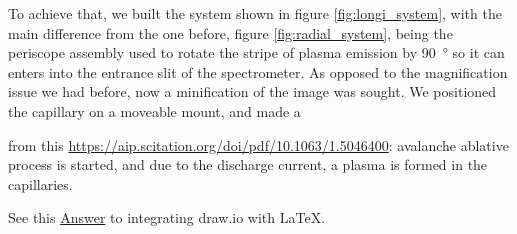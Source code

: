 \documentclass[nofonts]{tufte-book}
\begin{document}
To achieve that, we built the system shown in figure \ref{fig:longi_system}, with the main difference from the one before, figure \ref{fig:radial_system}, being the periscope assembly used to rotate the stripe of plasma emission by \SI{90}{\degree} so it can enters into the entrance slit of the spectrometer. As opposed to the magnification issue we had before, now a minification of the image was sought. We positioned the capillary on a moveable mount, and made a 


from this \href{article}{https://aip.scitation.org/doi/pdf/10.1063/1.5046400}: avalanche ablative process is started, and due to the discharge current, a plasma is formed in the capillaries.

See this \href{https://tex.stackexchange.com/a/427625}{Answer} to integrating draw.io with LaTeX.

\printbibliography
\end{document}
